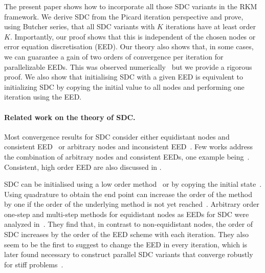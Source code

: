 \documentclass[sn-mathphys-num]{sn-jnl}%
\theoremstyle{thmstyleone}%
\theoremstyle{thmstyletwo}%
\theoremstyle{thmstylethree}%
\begin{document}
The present paper shows how to incorporate all those SDC variants in the RKM framework. 
We derive SDC from the Picard iteration perspective and prove, using Butcher series, that all SDC variants with $K$ iterations have at least order $K$. 
Importantly, our proof shows that this is independent of the chosen nodes or error equation discretisation (EED). 
Our theory also shows that, in some cases, we can guarantee a gain of two orders of convergence per iteration for parallelizable EEDs.
This was observed numerically~\citep{CaklovicEtAl2025} but we provide a rigorous proof.
We also show that initialising SDC with a given EED is equivalent to initializing SDC by copying the initial value to all nodes and performing one iteration using the EED.

\paragraph{Related work on the theory of SDC.}
Most convergence results for SDC consider either equidistant nodes and consistent EED~\citep{HairerOID78,HansenStrain2006,HansenStrain2011,CausleySeal2019,ChristliebEtAl2010_MoC,ChristliebEtAl2009} or arbitrary nodes and inconsistent EED~\citep{HagstromZhou2006,HuangEtAl2006,ShuEtAl2007,VanDerHouwen1991}. 
Few works address the combination of arbitrary nodes and consistent EEDs, one example being~\citep{RuprechtSpeck2016}.
Consistent, high order EED are also discussed in \citep{HairerOID78,HansenStrain2006,HansenStrain2011,ChristliebEtAl2010_MoC,ChristliebEtAl2009,TangEtAl2013}.

SDC can be initialised using a low order method~\citep{DuttEtAl2000} or by copying the initial state~\citep{Houwen1992,RuprechtSpeck2016}.
Using quadrature to obtain the end point can increase the order of the method by one if the order of the underlying method is not yet reached~\citep{ShuEtAl2007}. 
Arbitrary order one-step and multi-step methods for equidistant nodes as EEDs for SDC were analyzed in~\citep{HansenStrain2011,HansenStrain2006}.
They find that, in contrast to non-equidistant nodes, the order of SDC increases by the order of the EED scheme with each iteration.
They also seem to be the first to suggest to change the EED in every iteration, which is later found necessary to construct parallel SDC variants that converge robustly for stiff problems~\citep{CaklovicEtAl2025}.
\end{document}
